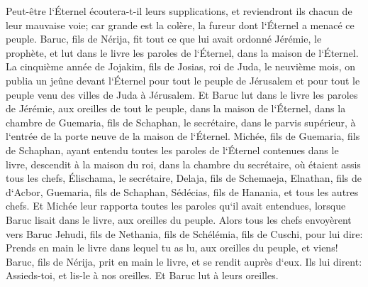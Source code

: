 \verse Peut-être l`Éternel écoutera-t-il leurs supplications, et reviendront ils chacun de leur mauvaise voie; car grande est la colère, la fureur dont l`Éternel a menacé ce peuple. 
\verse Baruc, fils de Nérija, fit tout ce que lui avait ordonné Jérémie, le prophète, et lut dans le livre les paroles de l`Éternel, dans la maison de l`Éternel. 
\verse La cinquième année de Jojakim, fils de Josias, roi de Juda, le neuvième mois, on publia un jeûne devant l`Éternel pour tout le peuple de Jérusalem et pour tout le peuple venu des villes de Juda à Jérusalem. 
\verse Et Baruc lut dans le livre les paroles de Jérémie, aux oreilles de tout le peuple, dans la maison de l`Éternel, dans la chambre de Guemaria, fils de Schaphan, le secrétaire, dans le parvis supérieur, à l`entrée de la porte neuve de la maison de l`Éternel. 
\verse Michée, fils de Guemaria, fils de Schaphan, ayant entendu toutes les paroles de l`Éternel contenues dans le livre, 
\verse descendit à la maison du roi, dans la chambre du secrétaire, où étaient assis tous les chefs, Élischama, le secrétaire, Delaja, fils de Schemaeja, Elnathan, fils de d`Acbor, Guemaria, fils de Schaphan, Sédécias, fils de Hanania, et tous les autres chefs. 
\verse Et Michée leur rapporta toutes les paroles qu`il avait entendues, lorsque Baruc lisait dans le livre, aux oreilles du peuple. 
\verse Alors tous les chefs envoyèrent vers Baruc Jehudi, fils de Nethania, fils de Schélémia, fils de Cuschi, pour lui dire: Prends en main le livre dans lequel tu as lu, aux oreilles du peuple, et viens! Baruc, fils de Nérija, prit en main le livre, et se rendit auprès d`eux. 
\verse Ils lui dirent: Assieds-toi, et lis-le à nos oreilles. Et Baruc lut à leurs oreilles. 
